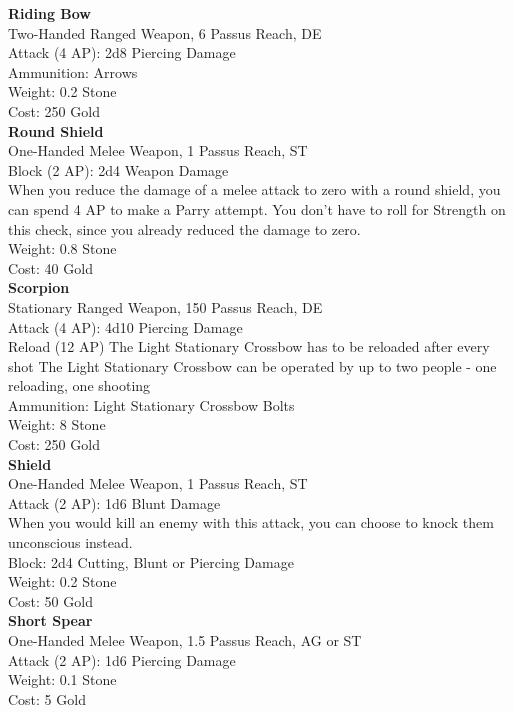 \textbf{Riding Bow}\\
Two-Handed Ranged Weapon, 6 Passus Reach, DE\\
Attack (4 AP): 2d8 Piercing Damage\\
Ammunition: Arrows\\
Weight: 0.2 Stone\\
Cost: 250 Gold\\


\textbf{Round Shield}\\
One-Handed Melee Weapon, 1 Passus Reach, ST\\
Block (2 AP): 2d4 Weapon Damage\\
When you reduce the damage of a melee attack to zero with a round shield, you can spend 4 AP to make a Parry attempt. You don't have to roll for Strength on this check, since you already reduced the damage to zero.\\
Weight: 0.8 Stone\\
Cost: 40 Gold\\


\textbf{Scorpion}\\
Stationary Ranged Weapon, 150 Passus Reach, DE\\
Attack (4 AP): 4d10 Piercing Damage\\
Reload (12 AP) The Light Stationary Crossbow has to be reloaded after every shot
The Light Stationary Crossbow can be operated by up to two people - one reloading, one shooting\\
Ammunition: Light Stationary Crossbow Bolts\\
Weight: 8 Stone\\
Cost: 250 Gold\\


\textbf{Shield}\\
One-Handed Melee Weapon, 1 Passus Reach, ST\\
Attack (2 AP): 1d6 Blunt Damage\\
When you would kill an enemy with this attack, you can choose to knock them unconscious instead.\\
Block: 2d4 Cutting, Blunt or Piercing Damage\\
Weight: 0.2 Stone\\
Cost: 50 Gold\\


\textbf{Short Spear}\\
One-Handed Melee Weapon, 1.5 Passus Reach, AG or ST\\
Attack (2 AP): 1d6 Piercing Damage\\
Weight: 0.1 Stone\\
Cost: 5 Gold\\


